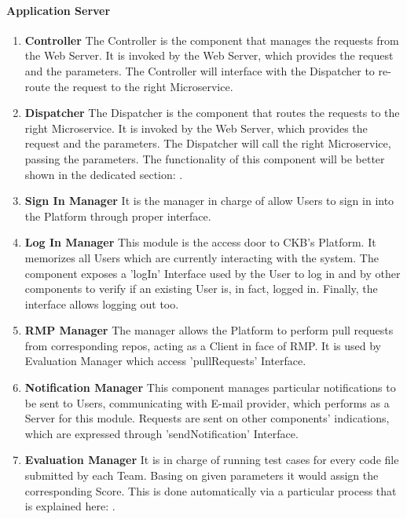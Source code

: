 \paragraph[Component]{Application Server} \label{cmp:cmp}
\begin{enumerate}
    \item \textbf{Controller} The Controller is the component that manages the requests from the Web Server. It is invoked by the Web Server, which provides the request and the parameters. The Controller will interface with the 
    Dispatcher to re-route the request to the right Microservice.
    \item \textbf{Dispatcher} The Dispatcher is the component that routes the requests to the right Microservice. It is invoked by the Web Server, which provides the request and the parameters. The Dispatcher will call the right Microservice, passing the parameters. The functionality of this component will be better shown in the dedicated section: .
    \item \textbf{Sign In Manager} \label{cmp:sim} It is the manager in charge of allow Users to sign in into the Platform through proper interface.
    \item \textbf{Log In Manager} \label{cmp:lim}This module is the access door to CKB's Platform. It memorizes all Users which are currently interacting with the system. The component exposes a 'logIn' Interface used by the User to log in 
    and by other components to verify if an existing User is, in fact, logged in. Finally, the interface allows logging out too.
    \item \textbf{RMP Manager} \label{cmp:rmpm}The manager allows the Platform to perform pull requests from corresponding repos, acting as a Client in face of RMP. It is used by Evaluation Manager which access 'pullRequests' Interface.
    \item \textbf{Notification Manager} \label{cmp:nm}This component manages particular notifications to be sent to Users, communicating with E-mail provider, which performs as a Server for this module. Requests are sent on other 
    components' indications, which are expressed through 'sendNotification' Interface.
    \item \textbf{Evaluation Manager} \label{cmp:em}It is in charge of running test cases for every code file submitted by each Team. Basing on given parameters it would assign the corresponding Score. This is done automatically via a particular process that is explained here: .

\end{enumerate}
